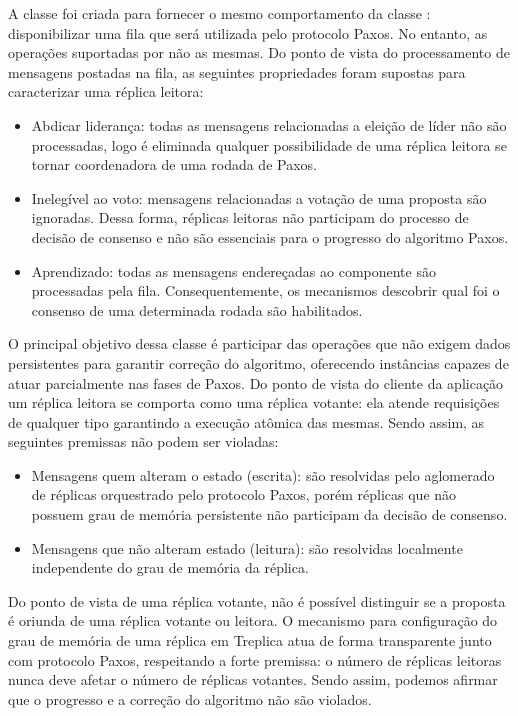 
A classe  foi criada para fornecer o mesmo comportamento da
classe : disponibilizar uma fila que será utilizada pelo
protocolo Paxos. No entanto, as operações suportadas por 
não as mesmas. Do ponto de vista do processamento de mensagens postadas na fila, as
seguintes propriedades foram supostas para caracterizar uma réplica leitora:

\begin{itemize}
  \item Abdicar liderança: todas as mensagens relacionadas a eleição de líder não são
    processadas, logo é eliminada qualquer possibilidade de uma réplica leitora se tornar
    coordenadora de uma rodada de Paxos.
  \item Inelegível ao voto: mensagens relacionadas a votação de uma proposta são
    ignoradas. Dessa forma, réplicas leitoras não participam do processo de decisão de
    consenso e não são essenciais para o progresso do algoritmo Paxos.
  \item Aprendizado: todas as mensagens endereçadas ao componente  são
    processadas pela fila. Consequentemente, os mecanismos descobrir qual foi o consenso
    de uma determinada rodada são habilitados.
\end{itemize}

O principal objetivo dessa classe é participar das operações que não exigem dados
persistentes para garantir correção do algoritmo, oferecendo instâncias capazes de atuar
parcialmente nas fases de Paxos. Do ponto de vista do cliente da aplicação um réplica
leitora se comporta como uma réplica votante: ela atende requisições de qualquer tipo
garantindo a execução atômica das mesmas. Sendo assim, as seguintes premissas não podem
ser violadas:

\begin{itemize}
  \item Mensagens quem alteram o estado (escrita): são resolvidas pelo aglomerado de
    réplicas orquestrado pelo protocolo Paxos, porém réplicas que não possuem grau de
    memória persistente não participam da decisão de consenso.
  \item Mensagens que não alteram estado (leitura): são resolvidas localmente independente
    do grau de memória da réplica.
\end{itemize}

Do ponto de vista de uma réplica votante, não é possível distinguir se a proposta é
oriunda de uma réplica votante ou leitora. O mecanismo para configuração do grau de
memória de uma réplica em Treplica atua de forma transparente junto com protocolo Paxos,
respeitando a forte premissa: o número de réplicas leitoras nunca deve afetar o número de
réplicas votantes. Sendo assim, podemos afirmar que o progresso e a correção do algoritmo
não são violados.


